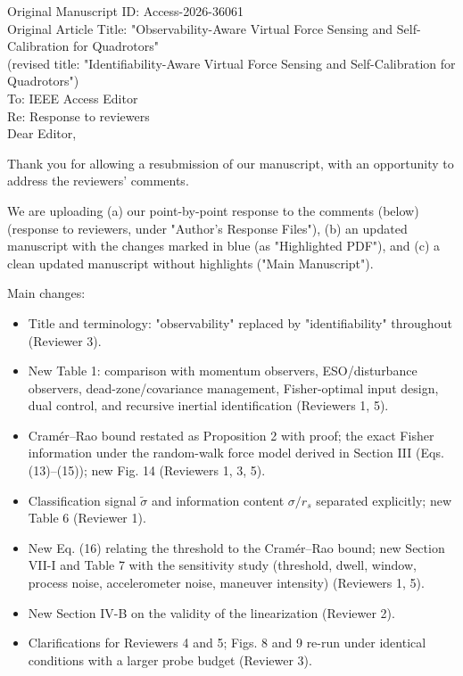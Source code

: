 \documentclass[11pt]{article}
\begin{document}
Original Manuscript ID: Access-2026-36061\\
Original Article Title: "Observability-Aware Virtual Force Sensing and Self-Calibration for Quadrotors"\\
(revised title: "Identifiability-Aware Virtual Force Sensing and Self-Calibration for Quadrotors")\\

To: IEEE Access Editor\\
Re: Response to reviewers\\

Dear Editor,

Thank you for allowing a resubmission of our manuscript, with an opportunity to address the reviewers' comments.

We are uploading (a) our point-by-point response to the comments (below) (response to reviewers, under "Author's Response Files"), (b) an updated manuscript with the changes marked in blue (as "Highlighted PDF"), and (c) a clean updated manuscript without highlights ("Main Manuscript").

Main changes:
\begin{itemize}[leftmargin=1.4em]
\item Title and terminology: "observability" replaced by "identifiability" throughout (Reviewer 3).
\item New Table 1: comparison with momentum observers, ESO/disturbance observers, dead-zone/covariance management, Fisher-optimal input design, dual control, and recursive inertial identification (Reviewers 1, 5).
\item Cram\'er--Rao bound restated as Proposition 2 with proof; the exact Fisher information under the random-walk force model derived in Section III (Eqs. (13)--(15)); new Fig. 14 (Reviewers 1, 3, 5).
\item Classification signal $\tilde\sigma$ and information content $\sigma/r_s$ separated explicitly; new Table 6 (Reviewer 1).
\item New Eq. (16) relating the threshold to the Cram\'er--Rao bound; new Section VII-I and Table 7 with the sensitivity study (threshold, dwell, window, process noise, accelerometer noise, maneuver intensity) (Reviewers 1, 5).
\item New Section IV-B on the validity of the linearization (Reviewer 2).
\item Clarifications for Reviewers 4 and 5; Figs. 8 and 9 re-run under identical conditions with a larger probe budget (Reviewer 3).
\end{itemize}
\end{document}
